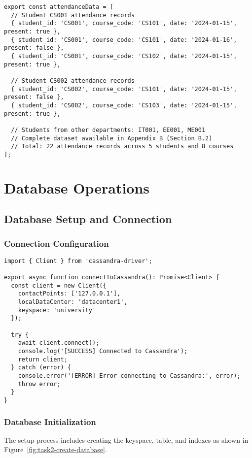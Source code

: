 \begin{verbatim}
export const attendanceData = [
  // Student CS001 attendance records
  { student_id: 'CS001', course_code: 'CS101', date: '2024-01-15', present: true },
  { student_id: 'CS001', course_code: 'CS101', date: '2024-01-16', present: false },
  { student_id: 'CS001', course_code: 'CS102', date: '2024-01-15', present: true },

  // Student CS002 attendance records
  { student_id: 'CS002', course_code: 'CS101', date: '2024-01-15', present: false },
  { student_id: 'CS002', course_code: 'CS103', date: '2024-01-15', present: true },

  // Students from other departments: IT001, EE001, ME001
  // Complete dataset available in Appendix B (Section B.2)
  // Total: 22 attendance records across 5 students and 8 courses
];
\end{verbatim}

\section{Database Operations}

\subsection{Database Setup and Connection}

\subsubsection{Connection Configuration}
\begin{verbatim}
import { Client } from 'cassandra-driver';

export async function connectToCassandra(): Promise<Client> {
  const client = new Client({
    contactPoints: ['127.0.0.1'],
    localDataCenter: 'datacenter1',
    keyspace: 'university'
  });

  try {
    await client.connect();
    console.log('[SUCCESS] Connected to Cassandra');
    return client;
  } catch (error) {
    console.error('[ERROR] Error connecting to Cassandra:', error);
    throw error;
  }
}
\end{verbatim}

\subsubsection{Database Initialization}
The setup process includes creating the keyspace, table, and indexes as shown in Figure~\ref{fig:task2-create-database}.


